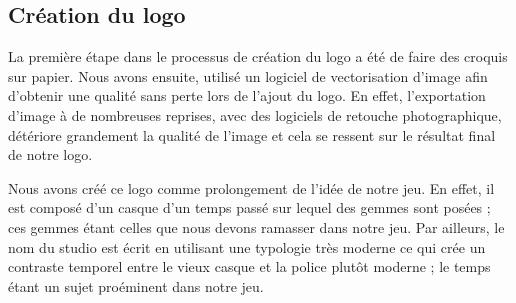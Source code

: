 \documentclass[12pt]{article}
\begin{document}
        \subsection{Création du logo}
        
            La première étape dans le processus de création du logo a été de faire des croquis sur papier. Nous avons ensuite, utilisé un logiciel de vectorisation d'image afin d'obtenir une qualité sans perte lors de l'ajout du logo. En effet, l'exportation d'image à de nombreuses reprises, avec des logiciels de retouche photographique, détériore grandement la qualité de l'image et cela se ressent sur le résultat final de notre logo.
            \\
            \par Nous avons créé ce logo comme prolongement de l'idée de notre jeu. En effet, il est composé d'un casque d'un temps passé sur lequel des gemmes sont posées ; ces gemmes étant celles que nous devons ramasser dans notre jeu. Par ailleurs, le nom du studio est écrit en utilisant une typologie très moderne ce qui crée un contraste temporel entre le vieux casque et la police plutôt moderne ; le temps étant un sujet proéminent dans notre jeu.
        
        
\end{document}

